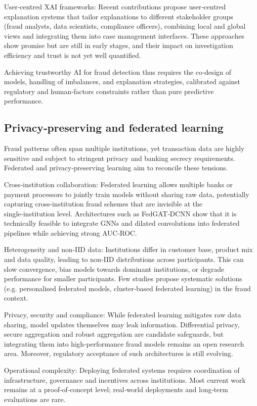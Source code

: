 \documentclass[a4paper,fleqn]{cas-dc}
\begin{document}
User‑centred XAI frameworks: Recent contributions propose user‑centred explanation systems that tailor explanations to different stakeholder groups (fraud analysts, data scientists, compliance officers), combining local and global views and integrating them into case management interfaces. 
These approaches show promise but are still in early stages, and their impact on investigation efficiency and trust is not yet well quantified.

Achieving trustworthy AI for fraud detection thus requires the co‑design of models, handling of imbalances, and explanation strategies, calibrated against regulatory and human‑factors constraints rather than pure predictive performance.

\subsection{Privacy‑preserving and federated learning}
Fraud patterns often span multiple institutions, yet transaction data are highly sensitive and subject to stringent privacy and banking secrecy requirements. 
Federated and privacy‑preserving learning aim to reconcile these tensions.

Cross‑institution collaboration: Federated learning allows multiple banks or payment processors to jointly train models without sharing raw data, potentially capturing cross‑institution fraud schemes that are invisible at the single‑institution level. 
Architectures such as FedGAT‑DCNN show that it is technically feasible to integrate GNNs and dilated convolutions into federated pipelines while achieving strong AUC‑ROC.

Heterogeneity and non‑IID data: Institutions differ in customer base, product mix and data quality, leading to non‑IID distributions across participants. 
This can slow convergence, bias models towards dominant institutions, or degrade performance for smaller participants. 
Few studies propose systematic solutions (e.g. personalised federated models, cluster‑based federated learning) in the fraud context.

Privacy, security and compliance: While federated learning mitigates raw data sharing, model updates themselves may leak information. 
Differential privacy, secure aggregation and robust aggregation are candidate safeguards, but integrating them into high‑performance fraud models remains an open research area. Moreover, regulatory acceptance of such architectures is still evolving.

Operational complexity: Deploying federated systems requires coordination of infrastructure, governance and incentives across institutions. 
Most current work remains at a proof‑of‑concept level; real‑world deployments and long‑term evaluations are rare.
\end{document}
